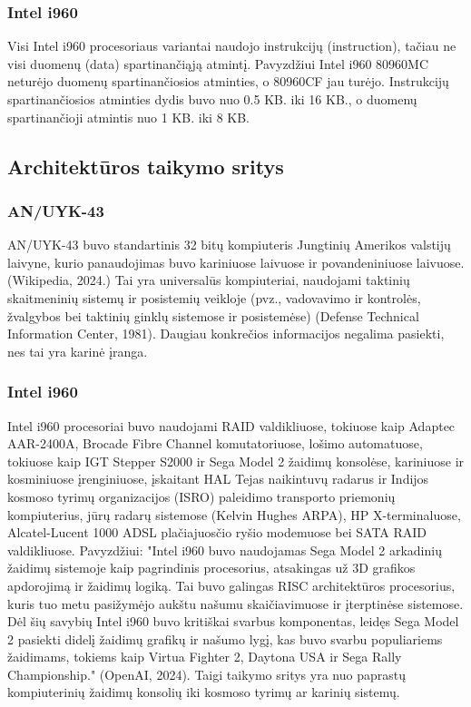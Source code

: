 \documentclass{article}
\begin{document}
\subsubsection{Intel i960}
Visi Intel i960 procesoriaus variantai naudojo instrukcijų (instruction), tačiau ne visi duomenų (data) spartinančiąją atmintį. Pavyzdžiui Intel i960 80960MC neturėjo duomenų spartinančiosios atminties, o 80960CF jau turėjo. Instrukcijų spartinančiosios atminties dydis buvo nuo 0.5 KB. iki 16 KB., o duomenų spartinančioji atmintis nuo 1 KB. iki 8 KB.
\subsection{Architektūros taikymo sritys}
\subsubsection{AN/UYK-43}
AN/UYK-43 buvo standartinis 32 bitų kompiuteris Jungtinių Amerikos valstijų laivyne, kurio panaudojimas buvo kariniuose laivuose ir povandeniniuose laivuose. (Wikipedia, 2024.) Tai yra universalūs kompiuteriai, naudojami taktinių skaitmeninių sistemų ir posistemių veikloje (pvz., vadovavimo ir kontrolės, žvalgybos bei taktinių ginklų sistemose ir posistemėse) (Defense Technical Information Center, 1981). Daugiau konkrečios informacijos negalima pasiekti, nes tai yra karinė įranga.
\subsubsection{Intel i960}
Intel i960 procesoriai buvo naudojami RAID valdikliuose, tokiuose kaip Adaptec AAR-2400A, Brocade Fibre Channel komutatoriuose, lošimo automatuose, tokiuose kaip IGT Stepper S2000 ir Sega Model 2 žaidimų konsolėse, kariniuose ir kosminiuose įrenginiuose, įskaitant HAL Tejas naikintuvų radarus ir Indijos kosmoso tyrimų organizacijos (ISRO) paleidimo transporto priemonių kompiuterius, jūrų radarų sistemose (Kelvin Hughes ARPA), HP X-terminaluose, Alcatel-Lucent 1000 ADSL plačiajuosčio ryšio modemuose bei SATA RAID valdikliuose. Pavyzdžiui: "Intel i960 buvo naudojamas Sega Model 2 arkadinių žaidimų sistemoje kaip pagrindinis procesorius, atsakingas už 3D grafikos apdorojimą ir žaidimų logiką. Tai buvo galingas RISC architektūros procesorius, kuris tuo metu pasižymėjo aukštu našumu skaičiavimuose ir įterptinėse sistemose. Dėl šių savybių Intel i960 buvo kritiškai svarbus komponentas, leidęs Sega Model 2 pasiekti didelį žaidimų grafikų ir našumo lygį, kas buvo svarbu populiariems žaidimams, tokiems kaip Virtua Fighter 2, Daytona USA ir Sega Rally Championship." (OpenAI, 2024). Taigi taikymo sritys yra nuo paprastų kompiuterinių žaidimų konsolių iki kosmoso tyrimų ar karinių sistemų.
\end{document}
